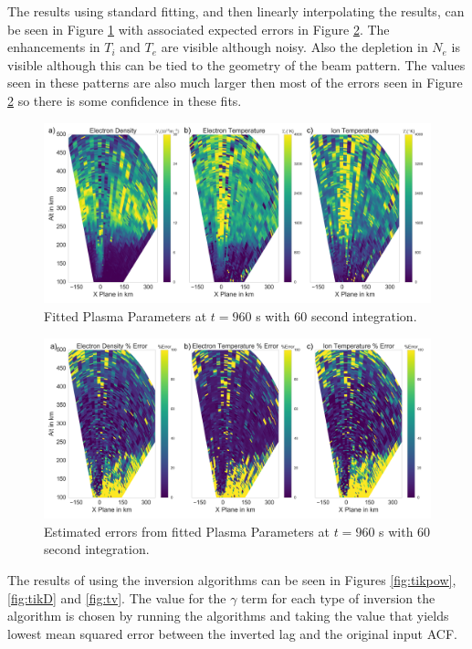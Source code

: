The results using standard fitting, and then linearly interpolating the results, can be seen in Figure \ref{fig:fplparamst60inv} with associated expected errors in Figure \ref{fig:fplparamst60errinv}. The enhancements in $T_i$ and $T_e$ are visible although noisy. Also the depletion in $N_e$ is visible although this can be tied to the geometry of the beam pattern. The values seen in these patterns are also much larger then most of the errors seen in Figure \ref{fig:fplparamst60errinv} so there is some confidence in these fits.

\begin{figure}[!ht]
\centering
\includegraphics[width=6in]{0960_60_int}
\caption{Fitted Plasma Parameters at $t=960$ s with 60 second integration.}
\label{fig:fplparamst60inv}
\end{figure}

\begin{figure}[!ht]
\centering
\includegraphics[width=6in]{0960_60_int_err}
\caption{Estimated errors from fitted Plasma Parameters at $t=960$ s with 60 second integration.}
\label{fig:fplparamst60errinv}
\end{figure}

The results of using the inversion algorithms can be seen in Figures \ref{fig:tikpow}, \ref{fig:tikD} and \ref{fig:tv}. The value for the $\gamma$ term for each type of inversion the algorithm is chosen by running the algorithms and taking the value that yields lowest mean squared error between the inverted lag and the original input ACF. 

